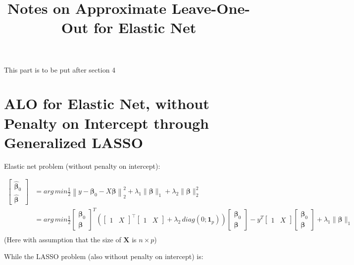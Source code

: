 \documentclass[11pt]{article}
\title{Notes on Approximate Leave-One-Out for Elastic Net}
\author{}
\newcommand{\bbeta}{\bm{\beta}}
\begin{document}
\maketitle

This part is to be put after section 4
\section{ALO for Elastic Net, without Penalty on Intercept through Generalized LASSO}
Elastic net problem (without penalty on intercept):

\begin{align*}
\begin{bmatrix}
\hat{\bbeta}_0 \\
\hat{\bbeta}
\end{bmatrix} &= arg\,min\frac{1}{2} \left\|y - \bbeta_0 - X\bbeta\right\|_2^2 + \lambda_1 \|\bbeta\|_1 + \lambda_2 \|\bbeta\|_2^2 \\
&= arg\,min\frac{1}{2} 
\begin{bmatrix}
\bbeta_0 \\
\bbeta
\end{bmatrix}^T \left(
\begin{bmatrix}
1 & X
\end{bmatrix}^\top
\begin{bmatrix}
1 & X
\end{bmatrix} + 
\lambda_2 \, diag(0; \bm{1}_p)
\right)
\begin{bmatrix} 
\bbeta_0 \\
\bbeta
\end{bmatrix} - y^T
\begin{bmatrix}
1 & X
\end{bmatrix} 
\begin{bmatrix}
\bbeta_0 \\
\bbeta
\end{bmatrix}   + \lambda_1 \|\bbeta\|_1
\\
\end{align*}
(Here with assumption that the size of $\bm{X}$ is $n \times p$) \par

While the LASSO problem (also without penalty on intercept) is:
\end{document}

